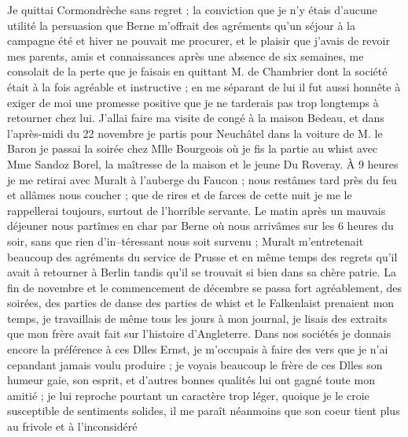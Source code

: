 \documentclass[12pt]{article}
\begin{document}
 Je quittai Cormondrèche sans regret ; la
conviction que je n’y étais d’aucune utilité la persuasion que Berne m’offrait des agréments qu’un
séjour à la campagne été et hiver ne pouvait me procurer, et le plaisir que j’avais de revoir mes
parents, amis et connaissances après une absence de six semaines, me consolait de la perte que je
faisais en quittant M. de Chambrier dont la société était à la fois agréable et instructive ; en me
séparant de lui il fut aussi honnête à exiger de moi une promesse positive que je ne tarderais pas
trop longtemps à retourner chez lui. J’allai faire ma visite de congé à la maison Bedeau, et dans
l’après-midi du 22 novembre je partis pour Neuchâtel dans la voiture de M. le Baron je passai la
soirée chez Mlle Bourgeois où je fis la partie au whist avec Mme Sandoz Borel, la maîtresse de la
maison et le jeune Du Roveray. À 9 heures je me retirai avec Muralt à l’auberge du Faucon ; nous
restâmes tard près du feu et allâmes nous coucher ; que de rires et de farces de cette nuit je me le
rappellerai toujours, surtout de l’horrible servante. Le matin après un mauvais déjeuner nous
partîmes en char par Berne où nous arrivâmes sur les 6 heures du soir, sans que rien d’in–téressant
nous soit survenu ; Muralt m’entretenait beaucoup des agréments du service de Prusse et en même
temps des regrets qu’il avait à retourner à Berlin tandis qu’il se trouvait si bien dans sa chère
patrie. La fin de novembre et le commencement de décembre se passa fort agréablement, des soirées,
des parties de danse des parties de whist et le Falkenlaist prenaient mon temps, je travaillais de
même tous les jours à mon journal, je lisais des extraits que mon frère avait fait sur l’histoire
d’Angleterre. Dans nos sociétés je donnais encore la préférence à ces Dlles Ernst, je m’occupais à
faire des vers que je n’ai cepandant jamais voulu produire ; je voyais beaucoup le frère de ces
Dlles son humeur gaie, son esprit, et d’autres bonnes qualités lui ont gagné toute mon amitié ; je
lui reproche pourtant un caractère trop léger, quoique je le croie susceptible de sentiments
solides, il me paraît néanmoins que son coeur tient plus au frivole et à l’inconsidéré
\end{document}
